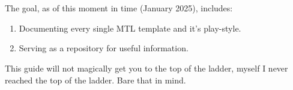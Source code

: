 \\
\\
The goal, as of this moment in time (January 2025), includes:
\begin{enumerate}
    \item Documenting every single MTL template and it's play-style.
    \item Serving as a repository for useful information.
\end{enumerate}

This guide will not magically get you to the top of the ladder, myself I never reached the top of the ladder. Bare that in mind.

